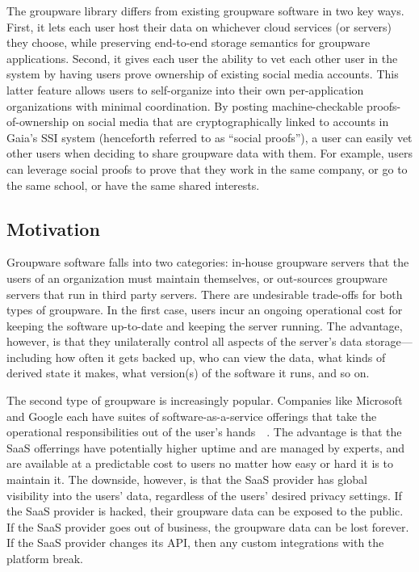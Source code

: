 The groupware library differs from existing groupware software in two key ways.
First, it lets each user host their data on whichever cloud services (or
servers) they choose, while preserving end-to-end storage semantics for
groupware applications.  Second, it gives each user the ability to vet each
other user in the system by having users prove ownership of existing social
media accounts.  This latter feature allows users to self-organize into their
own per-application organizations with minimal coordination.  By posting
machine-checkable proofs-of-ownership on social media that are cryptographically
linked to accounts in Gaia's SSI system (henceforth referred to as ``social
proofs''), a user can easily vet other users when deciding to share groupware
data with them.  For example, users can leverage social proofs to prove that
they work in the same company, or go to the same school, or have the same shared
interests.

\subsection{Motivation}

Groupware software falls into two categories:  in-house groupware servers that
the users of an organization must maintain themselves, or out-sources groupware
servers that run in third party servers.  There are undesirable 
trade-offs for both types of groupware.  In the first case, users incur an
ongoing operational cost for keeping the software up-to-date and keeping the
server running.  The advantage, however, is that they unilaterally control all
aspects of the server's data storage---including how often it gets backed up,
who can view the data, what kinds of derived state it makes, what version(s) of
the software it runs, and so on.

The second type of groupware is increasingly popular.  Companies like Microsoft
and Google each have suites of software-as-a-service offerings that take the
operational responsibilities out of the user's
hands~\cite{gapps}~\cite{microsoft-apps}.  The advantage is that the
SaaS offerrings have potentially higher uptime and are managed by experts, and
are available at a predictable cost to users no matter how easy or hard it is to
maintain it.  The downside, however, is that the SaaS provider has global
visibility into the users' data, regardless of the users' desired privacy
settings.  If the SaaS provider is hacked, their groupware data can be exposed
to the public.  If the SaaS provider goes out of business, the groupware data
can be lost forever.  If the SaaS provider changes its API, then any custom
integrations with the platform break.

